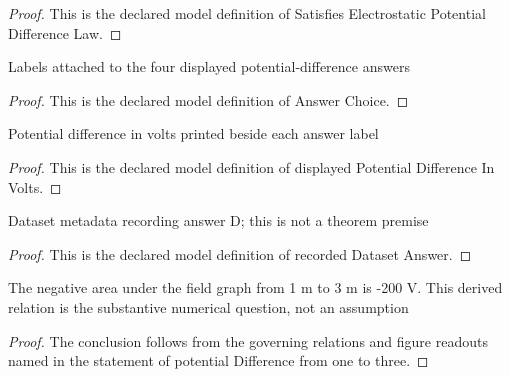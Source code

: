 \begin{proof}
  This is the declared model definition of Satisfies Electrostatic Potential Difference Law.
\end{proof}
\begin{definition}
  \label{def:physics:phyx-mini-0868:phyxminiproblems-problemphyxmini0868-answerchoice}
  Labels attached to the four displayed potential-difference answers
\end{definition}
\begin{proof}
  This is the declared model definition of Answer Choice.
\end{proof}
\begin{definition}
  \label{def:physics:phyx-mini-0868:phyxminiproblems-problemphyxmini0868-displayedpotentialdifferenceinvolts}
  Potential difference in volts printed beside each answer label
\end{definition}
\begin{proof}
  This is the declared model definition of displayed Potential Difference In Volts.
\end{proof}
\begin{definition}
  \label{def:physics:phyx-mini-0868:phyxminiproblems-problemphyxmini0868-recordeddatasetanswer}
  Dataset metadata recording answer D; this is not a theorem premise
\end{definition}
\begin{proof}
  This is the declared model definition of recorded Dataset Answer.
\end{proof}
\begin{lemma}
  \label{lem:physics:phyx-mini-0868:phyxminiproblems-problemphyxmini0868-potentialdifference-from-one-to-three}
  The negative area under the field graph from 1 m to 3 m is -200 V. This derived relation is the substantive numerical question, not an assumption
\end{lemma}
\begin{proof}
  The conclusion follows from the governing relations and figure readouts named in the statement of potential Difference from one to three.
\end{proof}
